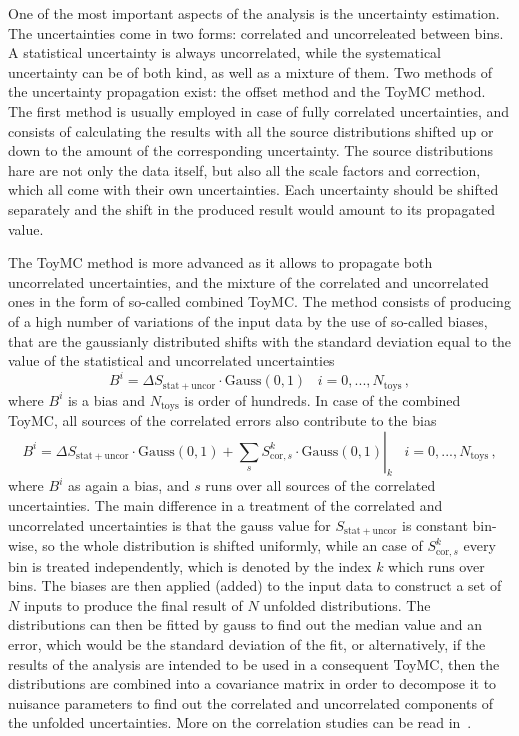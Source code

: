 One of the most important aspects of the analysis is the uncertainty estimation. The uncertainties come in two forms: correlated and uncorreleated between bins. A statistical uncertainty is always uncorrelated, while the systematical uncertainty can be of both kind, as well as a mixture of them. Two methods of the uncertainty propagation exist: the offset method and the ToyMC method. The first method is usually employed in case of fully correlated uncertainties, and consists of calculating the results with all the source distributions shifted up or down to the amount of the corresponding uncertainty. The source distributions hare are not only the data itself, but also all the scale factors and correction, which all come with their own uncertainties. Each uncertainty should be shifted separately and the shift in the produced result would amount to its propagated value.

The ToyMC method is more advanced as it allows to propagate both uncorrelated uncertainties, and the mixture of the correlated and uncorrelated ones in the form of so-called combined ToyMC. The method consists of producing of a high number of variations of the input data by the use of so-called biases, that are the gaussianly distributed shifts with the standard deviation equal to the value of the statistical and uncorrelated uncertainties
\begin{equation}
B^i = \Delta S_\mathrm{stat+uncor} \cdot \mathrm{Gauss}(0,1)\;\;\; i=0,...,N_\mathrm{toys}\,,
\end{equation}
where $B^i$ is a bias and $N_\mathrm{toys}$ is order of hundreds. In case of the combined ToyMC, all sources of the correlated errors also contribute to the bias
\begin{equation}
\left. B^i = \Delta S_\mathrm{stat+uncor} \cdot \mathrm{Gauss}(0,1) + \sum\limits_{s}S^k_{\mathrm{cor},s} \cdot \mathrm{Gauss}(0,1)\right\vert_k \;\;\; i=0,...,N_\mathrm{toys}\,,
\end{equation}
where $B^i$ as again a bias, and $s$ runs over all sources of the correlated uncertainties. The main difference in a treatment of the correlated and uncorrelated uncertainties is that the gauss value for $S_\mathrm{stat+uncor}$ is constant bin-wise, so the whole distribution is shifted uniformly, while an case of $S^k_{\mathrm{cor},s}$ every bin is treated independently, which is denoted by the index $k$ which runs over bins. The biases are then applied (added) to the input data to construct a set of $N$ inputs to produce the final result of $N$ unfolded distributions. The distributions can then be fitted by gauss to find out the median value and an error, which would be the standard deviation of the fit, or alternatively, if the results of the analysis are intended to be used in a consequent ToyMC, then the distributions are combined into a covariance matrix in order to decompose it to nuisance parameters to find out the correlated and uncorrelated components of the unfolded uncertainties. More on the correlation studies can be read in~\cite{lib:elec_support}.

